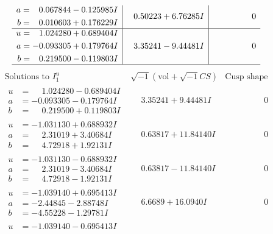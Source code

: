 \documentclass[1p]{elsarticle_modified}
\theoremstyle{definition}
\newcommand{\I}{\sqrt{-1}}
\begin{document}
$$\begin{array}{c|c|c}
\begin{aligned}
a &= \phantom{-}0.067844 - 0.125985 I \\
b &= \phantom{-}0.010603 + 0.176229 I\end{aligned}
 & \phantom{-}0.50223 + 6.76285 I & \phantom{-0.000000 } 0 \\ \hline\begin{aligned}
u &= \phantom{-}1.024280 + 0.689404 I \\
a &= -0.093305 + 0.179764 I \\
b &= \phantom{-}0.219500 - 0.119803 I\end{aligned}
 & \phantom{-}3.35241 - 9.44481 I & \phantom{-0.000000 } 0\\
 \hline 
 \end{array}$$\newpage$$\begin{array}{c|c|c}  
\text{Solutions to }I^u_{1}& \I (\text{vol} + \sqrt{-1}CS) & \text{Cusp shape}\\
 \hline 
\begin{aligned}
u &= \phantom{-}1.024280 - 0.689404 I \\
a &= -0.093305 - 0.179764 I \\
b &= \phantom{-}0.219500 + 0.119803 I\end{aligned}
 & \phantom{-}3.35241 + 9.44481 I & \phantom{-0.000000 } 0 \\ \hline\begin{aligned}
u &= -1.031130 + 0.688932 I \\
a &= \phantom{-}2.31019 + 3.40684 I \\
b &= \phantom{-}4.72918 + 1.92131 I\end{aligned}
 & \phantom{-}0.63817 + 11.84140 I & \phantom{-0.000000 } 0 \\ \hline\begin{aligned}
u &= -1.031130 - 0.688932 I \\
a &= \phantom{-}2.31019 - 3.40684 I \\
b &= \phantom{-}4.72918 - 1.92131 I\end{aligned}
 & \phantom{-}0.63817 - 11.84140 I & \phantom{-0.000000 } 0 \\ \hline\begin{aligned}
u &= -1.039140 + 0.695413 I \\
a &= -2.44845 - 2.88748 I \\
b &= -4.55228 - 1.29781 I\end{aligned}
 & \phantom{-}6.6689 + 16.0940 I & \phantom{-0.000000 } 0 \\ \hline\begin{aligned}
u &= -1.039140 - 0.695413 I \\

\end{aligned}
\end{array}$$
\end{document}
